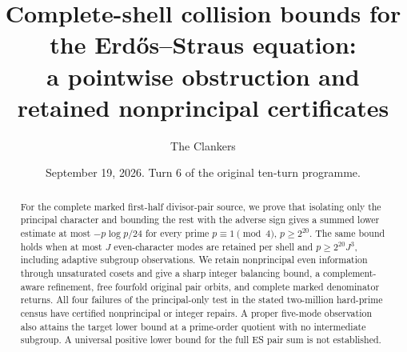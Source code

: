\documentclass[10pt,reqno]{amsart}
\title[ES full-shell collision bounds]{Complete-shell collision bounds for the Erd\H{o}s--Straus equation:\\a pointwise obstruction and retained nonprincipal certificates}
\author{The Clankers}
\date{September 19, 2026. Turn 6 of the original ten-turn programme.}
\begin{document}
\begin{abstract}
For the complete marked first-half divisor-pair source, we prove that isolating
only the principal character and bounding the rest with the adverse sign gives
a summed lower estimate at most $-p\log p/24$ for every prime $p\equiv1\pmod4$,
$p\ge2^{20}$. The same bound holds when at most $J$ even-character modes
are retained per shell and $p\ge2^{20}J^3$, including adaptive subgroup observations. We retain nonprincipal even information
through unsaturated cosets and give a sharp integer balancing bound, a
complement-aware refinement, free fourfold original pair orbits, and complete
marked denominator returns. All four failures of the principal-only test in
the stated two-million hard-prime census have certified nonprincipal or
integer repairs. A proper five-mode observation also attains the target lower
bound at a prime-order quotient with no intermediate subgroup. A universal positive lower bound for the full ES pair sum is
not established.
\end{abstract}
\maketitle


\end{document}
